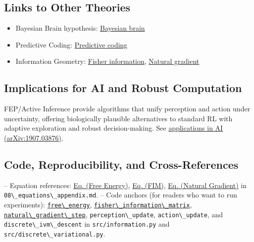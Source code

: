 \documentclass[
  10pt,
]{article}
\newcommand{\passthrough}[1]{#1}
\providecommand{\tightlist}{%
  \setlength{\itemsep}{0pt}\setlength{\parskip}{0pt}}
\begin{document}
\hypertarget{links-to-other-theories}{%
\subsection{Links to Other Theories}\label{links-to-other-theories}}

\begin{itemize}
\tightlist
\item
  Bayesian Brain hypothesis:
  \href{https://en.wikipedia.org/wiki/Bayesian_brain}{Bayesian brain}
\item
  Predictive Coding:
  \href{https://en.wikipedia.org/wiki/Predictive_coding}{Predictive
  coding}
\item
  Information Geometry:
  \href{https://en.wikipedia.org/wiki/Fisher_information}{Fisher
  information},
  \href{https://en.wikipedia.org/wiki/Natural_gradient}{Natural
  gradient}
\end{itemize}

\hypertarget{implications-for-ai-and-robust-computation}{%
\subsection{Implications for AI and Robust
Computation}\label{implications-for-ai-and-robust-computation}}

FEP/Active Inference provide algorithms that unify perception and action
under uncertainty, offering biologically plausible alternatives to
standard RL with adaptive exploration and robust decision-making. See
\href{https://arxiv.org/abs/1907.03876}{applications in AI
(arXiv:1907.03876)}.

\hypertarget{code-reproducibility-and-cross-references}{%
\subsection{Code, Reproducibility, and
Cross-References}\label{code-reproducibility-and-cross-references}}

-- Equation references:
\href{08_equations_appendix.md\#eq:free_energy}{Eq. (Free Energy)},
\href{08_equations_appendix.md\#eq:fim}{Eq. (FIM)},
\href{08_equations_appendix.md\#eq:natgrad}{Eq. (Natural Gradient)} in
\passthrough{\lstinline!08\_equations\_appendix.md!}. -- Code anchors
(for readers who want to run experiments):
\href{03_quadray_methods.md\#code:free_energy}{\passthrough{\lstinline!free\_energy!}},
\href{03_quadray_methods.md\#code:fisher_information_matrix}{\passthrough{\lstinline!fisher\_information\_matrix!}},
\href{03_quadray_methods.md\#code:natural_gradient_step}{\passthrough{\lstinline!natural\_gradient\_step!}},
\passthrough{\lstinline!perception\_update!},
\passthrough{\lstinline!action\_update!}, and
\passthrough{\lstinline!discrete\_ivm\_descent!} in
\passthrough{\lstinline!src/information.py!} and
\passthrough{\lstinline!src/discrete\_variational.py!}.
\end{document}
